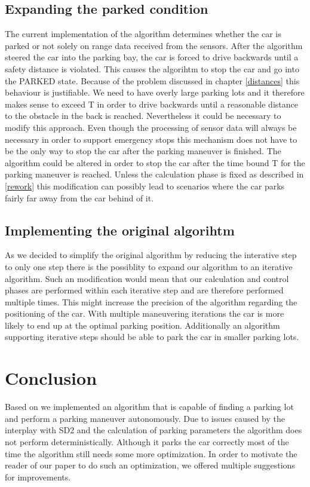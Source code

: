 \documentclass[paper=a4, fontsize=11pt]{scrreprt}
\begin{document}
\subsection{Expanding the parked condition}
The current implementation of the algorithm determines whether the car is parked or not solely on range data received from the sensors. After the algorithm steered the car into the parking bay, the car is forced to drive backwards until a safety distance is violated. This causes the algorihtm to stop the car and go into the PARKED state.
Because of the problem discussed in chapter \ref{distances} this behaviour is justifiable. We need to have overly large parking lots and it therefore makes sense to exceed T in order to drive backwards until a reasonable distance to the obstacle in the back is reached.
Nevertheless it could be necessary to modify this approach. Even though the processing of sensor data will always be necessary in order to support emergency stops this mechanism does not have to be the only way to stop the car after the parking maneuver is finished. The algorithm could be altered in order to stop the car after the time bound T for the parking maneuver is reached. 
Unless the calculation phase is fixed as described in \ref{rework} this modification can possibly lead to scenarios where the car parks fairly far away from the car behind of it.
\subsection{Implementing the original algorihtm}
As we decided to simplify the original algorithm by reducing the interative step to only one step there is the possiblity to expand our algorithm to an iterative algorithm. Such an modification would mean that our calculation and control phases are performed within each iterative step and are therefore performed multiple times. This might increase the precision of the algorithm regarding the positioning of the car. With multiple maneuvering iterations the car is more likely to end up at the optimal parking position. Additionally an algorithm supporting iterative steps should be able to park the car in smaller parking lots. 
\section{Conclusion}
Based on \cite{mgcpav} we implemented an algorithm that is capable of finding a parking lot and perform a parking maneuver autonomously. Due to issues caused by the interplay with SD2 and the calculation of  parking parameters the algorithm does not perform deterministically. Although it parks the car correctly most of the time the algorithm still needs some more optimization. In order to motivate the reader of our paper to do such an optimization, we offered multiple suggestions for improvements.

\end{document}
